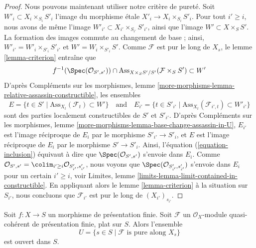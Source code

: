 \begin{proof}
\medskip\noindent
Nous pouvons maintenant utiliser notre critère de pureté.
Soit $W'_i \subset X_i \times_{S_i} S'_i$ l'image du morphisme
\'etale $X'_i \to X_i \times_{S_i} S'_i$. Pour tout $i' \geq i$,
nous avons de même l'image $W'_{i'} \subset X_{i'} \times_{S_{i'}} S'_{i'}$,
ainsi que l'image $W' \subset X \times_S S'$. La formation des images commute
au changement de base ; ainsi, $W'_{i'} = W'_i \times_{S'_i} S'_{i'}$ et
$W' = W_i \times_{S'_i} S'$. Comme
$\mathcal{F}$ est pur le long de $X_s$, le
lemme \ref{lemma-criterion}
entraîne que
\begin{equation}
\label{equation-inclusion}
f^{-1}(\Spec(\mathcal{O}_{S', s'})) \cap
\text{Ass}_{X \times_S S'/S'}(\mathcal{F} \times_S S') \subset W'
\end{equation}
D'après
Compléments sur les morphismes,
lemme \ref{more-morphisms-lemma-relative-assassin-constructible},
les ensembles
$$
E = \{t \in S' \mid \text{Ass}_{X_t}(\mathcal{F}_t) \subset W' \}
\quad\text{and}\quad
E_{i'} = \{t \in S'_{i'} \mid
\text{Ass}_{X_t}(\mathcal{F}_{i', t}) \subset W'_{i'} \}
$$
sont des parties localement constructibles de $S'$ et $S'_{i'}$. D'après
Compléments sur les morphismes,
lemme \ref{more-morphisms-lemma-base-change-assassin-in-U},
$E_{i'}$ est l'image réciproque de $E_i$ par le morphisme
$S'_{i'} \to S'_i$, et $E$ est l'image réciproque de $E_i$ par
le morphisme $S' \to S'_i$. Ainsi,
l'équation (\ref{equation-inclusion})
équivaut à dire que
$\Spec(\mathcal{O}_{S', s'})$ s'envoie dans $E_i$. Comme
$\mathcal{O}_{S', s'} =
\colim_{i' \geq i} \mathcal{O}_{S'_{i'}, s'_{i'}}$,
nous voyons que $\Spec(\mathcal{O}_{S'_{i'}, s'_{i'}})$
s'envoie dans $E_i$ pour un certain $i' \geq i$, voir
Limites, lemme \ref{limits-lemma-limit-contained-in-constructible}.
En appliquant alors le
lemme \ref{lemma-criterion}
à la situation sur $S_{i'}$,
nous concluons que $\mathcal{F}_{i'}$ est pur le long de $(X_{i'})_{s_{i'}}$.
\end{proof}

\begin{lemma}
\label{lemma-flat-finite-presentation-purity-open}
Soit $f : X \to S$ un morphisme de présentation finie.
Soit $\mathcal{F}$ un $\mathcal{O}_X$-module quasi-cohérent
de présentation finie, plat sur $S$. Alors l'ensemble
$$
U = \{s \in S \mid \mathcal{F}\text{ is pure along }X_s\}
$$
est ouvert dans $S$.
\end{lemma}

